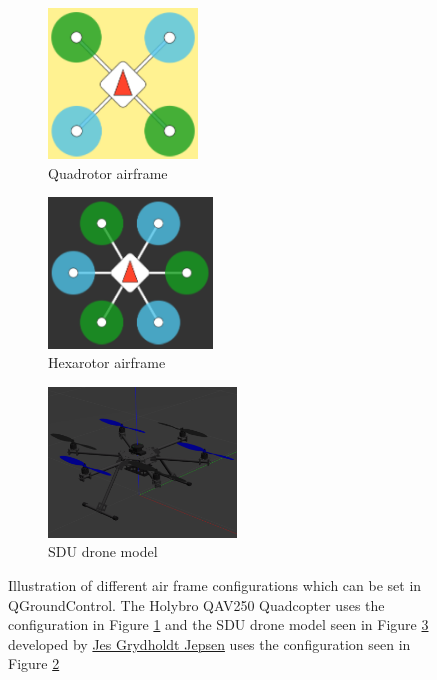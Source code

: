 \documentclass[../Head/report.tex]{subfiles}
\begin{document}
\begin{figure}[H]
    \centering
    \begin{subfigure}[b]{.27\textwidth}
        \centering
        \includegraphics[height=4.0cm]{../Figures/Quadrotor.png}
        \caption{Quadrotor airframe}
        \label{fig:quadrotor}
    \end{subfigure}
    \begin{subfigure}[b]{.27\textwidth}
        \centering
        \includegraphics[height=4.0cm]{../Figures/hexarotor.png}
        \caption{Hexarotor airframe}
        \label{fig:hexarotor}
    \end{subfigure}
    \begin{subfigure}[b]{.34\textwidth}
        \centering
        \includegraphics[height=4.0cm]{../Figures/sdu_drone.png}
        \caption{SDU drone model}
        \label{fig:sdu_drone}
    \end{subfigure}
    \caption{Illustration of different air frame configurations which can be set in QGroundControl. The Holybro QAV250 Quadcopter uses the configuration in Figure \ref{fig:quadrotor} and the SDU drone model seen in Figure \ref{fig:sdu_drone} developed by \href{https://portal.findresearcher.sdu.dk/da/persons/jes-grydholdt-jepsen}{Jes Grydholdt Jepsen} uses the configuration seen in Figure \ref{fig:hexarotor}}
    \label{fig:airframes}
\end{figure}
\end{document}
